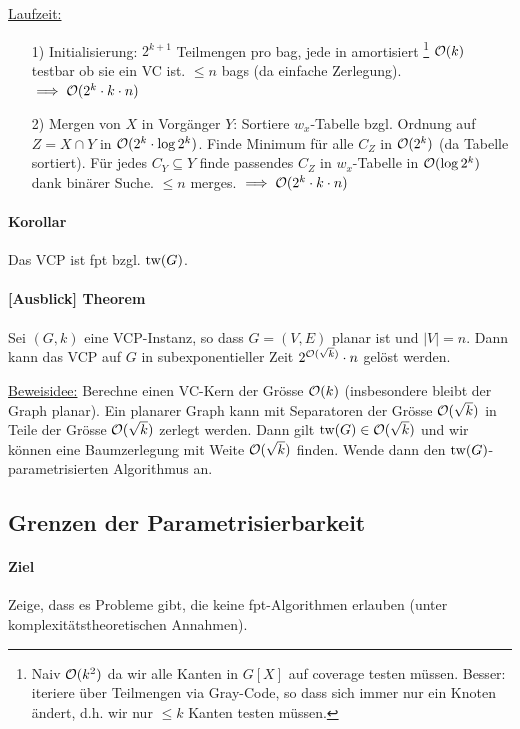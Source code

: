 \underline{Laufzeit:}
\begin{itemize}
    \item[1)] Initialisierung: $2^{k+1}$ Teilmengen pro bag, jede in amortisiert%
    \footnote{Naiv $\mathcal{O} (k^2)$ da wir alle Kanten in $G[X]$ auf coverage testen müssen.
    Besser: iteriere über Teilmengen via Gray-Code, so dass sich immer nur ein Knoten ändert,
    d.h. wir nur $\leq k$ Kanten testen müssen.}
    $\mathcal{O} (k)$ testbar ob sie ein VC ist.
    $\leq n$ bags (da einfache Zerlegung).
    $\implies \mathcal{O} (2^k \cdot k \cdot n)$
    \item[2)] Mergen von $X$ in Vorgänger $Y$:
    Sortiere $w_x$-Tabelle bzgl. Ordnung auf $Z=X \cap Y$ in $\mathcal{O} (2^k \cdot \log 2^k)$.
    Finde Minimum für alle $C_Z$ in $\mathcal{O}(2^k)$ (da Tabelle sortiert).
    Für jedes $C_Y \subseteq Y$ finde passendes $C_Z$ in $w_x$-Tabelle in $\mathcal{O}(\log 2^k)$ dank binärer Suche.
    $\leq n$ merges.
    $\implies \mathcal{O} (2^k \cdot k \cdot n)$
\end{itemize}

\paragraph{Korollar}
Das VCP ist fpt bzgl. $\text{tw}(G)$.

\paragraph{[Ausblick] Theorem}
Sei $(G, k)$ eine VCP-Instanz, so dass $G=(V,E)$ planar ist und $|V|=n$.
Dann kann das VCP auf $G$ in subexponentieller Zeit $2^{\mathcal{O} (\sqrt{k})} \cdot n$ gelöst werden.

\underline{Beweisidee:}
Berechne einen VC-Kern der Grösse $\mathcal{O} (k)$ (insbesondere bleibt der Graph planar).
Ein planarer Graph kann mit Separatoren der Grösse $\mathcal{O} (\sqrt{k})$ in Teile der Grösse
$\mathcal{O} (\sqrt{k})$ zerlegt werden.
Dann gilt $\text{tw}(G) \in \mathcal{O} (\sqrt{k})$ und wir können eine Baumzerlegung mit Weite $\mathcal{O} (\sqrt{k})$ finden.
Wende dann den $\text{tw}(G)$-parametrisierten Algorithmus an.


\subsection{Grenzen der Parametrisierbarkeit}

\paragraph{Ziel}
Zeige, dass es Probleme gibt, die keine fpt-Algorithmen erlauben (unter komplexitätstheoretischen Annahmen).

